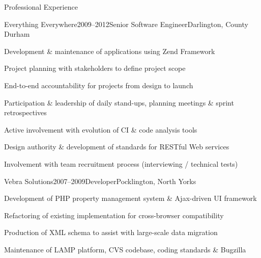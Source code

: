 \documentclass{cv}
\begin{document}
\begin{rSection}{Professional Experience}


\begin{rSubsection}{Everything Everywhere}{2009--2012}{Senior Software Engineer}{Darlington, County Durham}
\item Development \& maintenance of applications using Zend Framework
\item Project planning with stakeholders to define project scope
\item End-to-end accountability for projects from design to launch
\item Participation \& leadership of daily stand-ups, planning meetings \& sprint retrospectives
\item Active involvement with evolution of CI \& code analysis tools
\item Design authority \& development of standards for RESTful Web services
\item Involvement with team recruitment process (interviewing / technical tests)
\end{rSubsection}


\begin{rSubsection}{Vebra Solutions}{2007--2009}{Developer}{Pocklington, North Yorks}
\item Development of PHP property management system \& Ajax-driven UI framework
\item Refactoring of existing implementation for cross-browser compatibility
\item Production of XML schema to assist with large-scale data migration
\item Maintenance of LAMP platform, CVS codebase, coding standards \& Bugzilla
\end{rSubsection}

\end{rSection}

\end{document}
